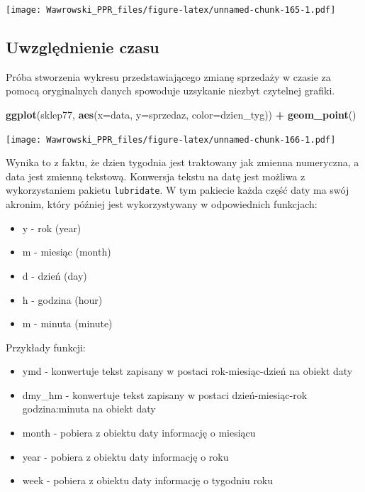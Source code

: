 \documentclass[]{book}
\newenvironment{Shaded}{\begin{snugshade}}{\end{snugshade}}
\newcommand{\KeywordTok}[1]{\textcolor[rgb]{0.13,0.29,0.53}{\textbf{#1}}}
\newcommand{\DataTypeTok}[1]{\textcolor[rgb]{0.13,0.29,0.53}{#1}}
\newcommand{\StringTok}[1]{\textcolor[rgb]{0.31,0.60,0.02}{#1}}
\newcommand{\OperatorTok}[1]{\textcolor[rgb]{0.81,0.36,0.00}{\textbf{#1}}}
\newcommand{\NormalTok}[1]{#1}
\providecommand{\tightlist}{%
  \setlength{\itemsep}{0pt}\setlength{\parskip}{0pt}}
\begin{document}
\texttt{[image: Wawrowski\_PPR\_files/figure-latex/unnamed-chunk-165-1.pdf]}

\subsection{Uwzględnienie czasu}\label{uwzglednienie-czasu}

Próba stworzenia wykresu przedstawiającego zmianę sprzedaży w czasie za
pomocą oryginalnych danych spowoduje uzsykanie niezbyt czytelnej
grafiki.

\begin{Shaded}
\begin{Highlighting}[]
\KeywordTok{ggplot}\NormalTok{(sklep77, }\KeywordTok{aes}\NormalTok{(}\DataTypeTok{x=}\NormalTok{data,}
                    \DataTypeTok{y=}\NormalTok{sprzedaz,}
                    \DataTypeTok{color=}\NormalTok{dzien_tyg)) }\OperatorTok{+}
\StringTok{  }\KeywordTok{geom_point}\NormalTok{()}
\end{Highlighting}
\end{Shaded}

\texttt{[image: Wawrowski\_PPR\_files/figure-latex/unnamed-chunk-166-1.pdf]}

Wynika to z faktu, że dzien tygodnia jest traktowany jak zmienna
numeryczna, a data jest zmienną tekstową. Konwersja tekstu na datę jest
możliwa z wykorzystaniem pakietu \texttt{lubridate}. W tym pakiecie
każda część daty ma swój akronim, który później jest wykorzystywany w
odpowiednich funkcjach:

\begin{itemize}
\tightlist
\item
  y - rok (year)
\item
  m - miesiąc (month)
\item
  d - dzień (day)
\item
  h - godzina (hour)
\item
  m - minuta (minute)
\end{itemize}

Przykłady funkcji:

\begin{itemize}
\tightlist
\item
  ymd - konwertuje tekst zapisany w postaci rok-miesiąc-dzień na obiekt
  daty
\item
  dmy\_hm - konwertuje tekst zapisany w postaci dzień-miesiąc-rok
  godzina:minuta na obiekt daty
\item
  month - pobiera z obiektu daty informację o miesiącu
\item
  year - pobiera z obiektu daty informację o roku
\item
  week - pobiera z obiektu daty informację o tygodniu roku
\end{itemize}
\end{document}
